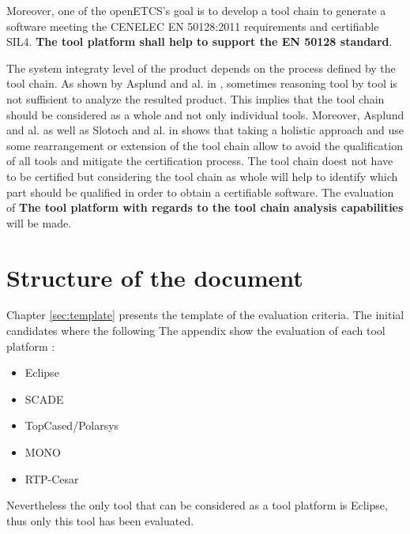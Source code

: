 Moreover, one of the openETCS's goal is to develop a tool chain to
generate a software meeting the CENELEC EN 50128:2011 requirements and
certifiable \gls{SIL}4. {\bf The tool platform shall help to support the EN 50128
standard}. 

The system integraty level of the product depends on the process
defined by the tool chain. As shown by Asplund and al. in
\cite{asplund_qualifying_2012}, sometimes reasoning tool by tool is
not suffisient to analyze the resulted product.  This implies that the
tool chain should be considered as a whole and not only individual
tools. Moreover, Asplund and al. as well as Slotoch and al. in
\cite{slotosch_iso_2012} shows that taking a holistic approach and use
some rearrangement or extension of the tool chain allow to avoid the
qualification of all tools and mitigate the certification process.
The tool chain doest not have to be certified but considering the tool
chain as whole will help to identify which part should be qualified in
order to obtain a certifiable software.  The evaluation of {\bf The
  tool platform with regards to the tool chain analysis capabilities}
will be made.


\section{Structure of the document}

Chapter \ref{sec:template} presents the template of the evaluation
criteria.
The initial candidates where the following
The appendix show the evaluation of each tool platform :
\begin{itemize}
\item Eclipse
\item SCADE
\item TopCased/Polarsys
\item MONO
\item RTP-Cesar
\end{itemize}

Nevertheless the only tool that can be considered as a tool platform
is Eclipse, thus only this tool has been evaluated.

\printglossary


